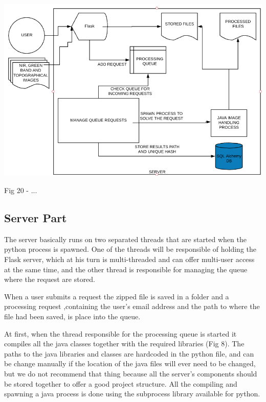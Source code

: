 \documentclass[12pt, a4paper]{report}
\begin{document}
\medskip
\includegraphics[scale=0.795, right]{application_overview.png}
\begin{center}
Fig 20 - ... 
\end{center}
\par 

\subsection{Server Part}

\quad 
The server basically runs on two separated threads that are started when the python process is spawned. One of the threads will be responsible of holding the Flask server, which at his turn is multi-threaded and can offer multi-user access at the same time, and the other thread is responsible for managing the queue where the request are stored.
\par 

When a user submits a request the zipped file is saved in a folder  and a processing request ,containing the user's email address and the path to where the file had been saved, is place into the queue. 
\par 

At first, when the thread responsible for the processing queue is started it compiles all the java classes together with the required libraries (Fig 8). The paths to the java libraries and classes are hardcoded in the python file, and can be change manually if the location of the java files will ever need to be changed, but we do not recommend that thing because all the server's components should be stored together to offer a good project structure. All the compiling and spawning a java process is done using the subprocess library available for python. 
\par 
\end{document}
